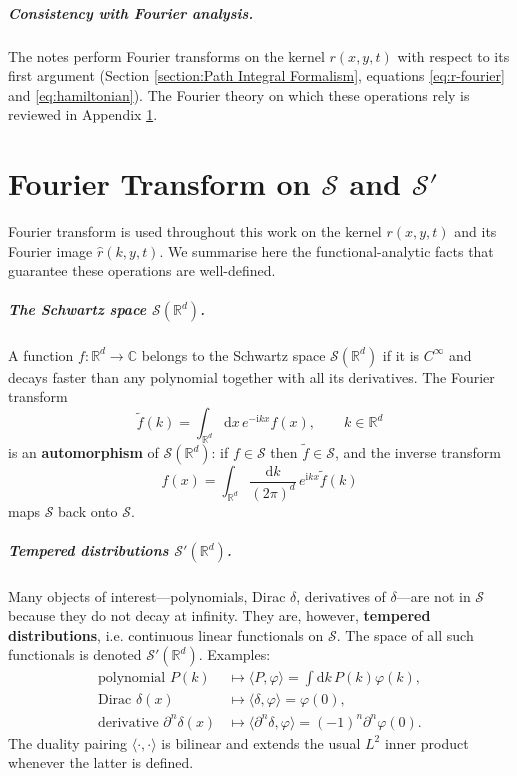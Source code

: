 \documentclass{book}
\newcommand{\mathd}{\mathrm{d}}
\newcommand{\mathi}{\mathrm{i}}
\newcommand{\mathpi}{\pi}
\newcommand{\tmstrong}[1]{\textbf{#1}}
\begin{document}
\paragraph{Consistency with Fourier analysis.}
The notes perform Fourier transforms on the kernel $r (x, y, t)$ with
respect to its first argument (Section \ref{section:Path Integral
Formalism}, equations \ref{eq:r-fourier} and \ref{eq:hamiltonian}).
The Fourier theory on which these operations rely is reviewed in
Appendix \ref{appendix:fourier-on-sprime}.

\chapter{Fourier Transform on $\mathcal{S}$ and
$\mathcal{S}'$}\label{appendix:fourier-on-sprime}

Fourier transform is used throughout this work on the kernel
$r (x, y, t)$ and its Fourier image $\hat{r} (k, y, t)$.  We summarise
here the functional-analytic facts that guarantee these operations are
well-defined.

\paragraph{The Schwartz space $\mathcal{S} (\mathbb{R}^d)$.}
A function $f : \mathbb{R}^d \to \mathbb{C}$ belongs to the Schwartz space
$\mathcal{S} (\mathbb{R}^d)$ if it is $C^{\infty}$ and decays faster than
any polynomial together with all its derivatives.  The Fourier transform
\begin{equation}
  \tilde f (k) = \int_{\mathbb{R}^d} \mathd x \, e^{- \mathi k x}
  f (x), \qquad k \in \mathbb{R}^d
\end{equation}
is an {\tmstrong{automorphism}} of $\mathcal{S} (\mathbb{R}^d)$:
if $f \in \mathcal{S}$ then $\tilde f \in \mathcal{S}$, and the inverse
transform
\[ f (x) = \int_{\mathbb{R}^d} \frac{\mathd k}{(2 \mathpi)^d} \,
   e^{\mathi k x} \tilde f (k) \]
maps $\mathcal{S}$ back onto $\mathcal{S}$.

\paragraph{Tempered distributions $\mathcal{S}' (\mathbb{R}^d)$.}
Many objects of interest---polynomials, Dirac $\delta$, derivatives of
$\delta$---are not in $\mathcal{S}$ because they do not decay at infinity.
They are, however, {\tmstrong{tempered distributions}}, i.e. continuous
linear functionals on $\mathcal{S}$.  The space of all such functionals is
denoted $\mathcal{S}' (\mathbb{R}^d)$.  Examples:
\begin{align*}
  \text{polynomial } P (k) &\longmapsto \langle P, \varphi \rangle =
  \int \mathd k \, P (k) \varphi (k),\\
  \text{Dirac } \delta (x) &\longmapsto \langle \delta, \varphi \rangle =
  \varphi (0),\\
  \text{derivative } \partial^n \delta (x) &\longmapsto
  \langle \partial^n \delta, \varphi \rangle = (- 1)^n
  \partial^n \varphi (0) .
\end{align*}
The duality pairing $\langle \cdot, \cdot \rangle$ is bilinear and extends
the usual $L^2$ inner product whenever the latter is defined.
\end{document}
